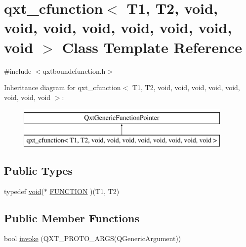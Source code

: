 \hypertarget{classqxt__cfunction_3_01_t1_00_01_t2_00_01void_00_01void_00_01void_00_01void_00_01void_00_01void_00_01void_00_01void_01_4}{\section{qxt\-\_\-cfunction$<$ T1, T2, void, void, void, void, void, void, void, void $>$ Class Template Reference}
\label{classqxt__cfunction_3_01_t1_00_01_t2_00_01void_00_01void_00_01void_00_01void_00_01void_00_01void_00_01void_00_01void_01_4}
}


{\ttfamily \#include $<$qxtboundcfunction.\-h$>$}

Inheritance diagram for qxt\-\_\-cfunction$<$ T1, T2, void, void, void, void, void, void, void, void $>$\-:\begin{figure}[H]
\begin{center}
\leavevmode
\includegraphics[height=2.000000cm]{classqxt__cfunction_3_01_t1_00_01_t2_00_01void_00_01void_00_01void_00_01void_00_01void_00_01void_00_01void_00_01void_01_4}
\end{center}
\end{figure}
\subsection*{Public Types}
\begin{DoxyCompactItemize}
\item 
typedef \hyperlink{group___u_a_v_objects_plugin_ga444cf2ff3f0ecbe028adce838d373f5c}{void}($\ast$ \hyperlink{classqxt__cfunction_3_01_t1_00_01_t2_00_01void_00_01void_00_01void_00_01void_00_01void_00_01void_00_01void_00_01void_01_4_a7263a37914a8351bd6279e18f13558c2}{F\-U\-N\-C\-T\-I\-O\-N} )(T1, T2)
\end{DoxyCompactItemize}
\subsection*{Public Member Functions}
\begin{DoxyCompactItemize}
\item 
bool \hyperlink{classqxt__cfunction_3_01_t1_00_01_t2_00_01void_00_01void_00_01void_00_01void_00_01void_00_01void_00_01void_00_01void_01_4_aecd32d79365e402dd352d11659916d5a}{invoke} (Q\-X\-T\-\_\-\-P\-R\-O\-T\-O\-\_\-A\-R\-G\-S(Q\-Generic\-Argument))
\end{DoxyCompactItemize}
